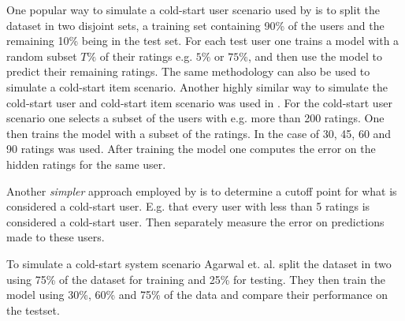 One popular way to simulate a cold-start user scenario used by \cite{Stern2009, Lam2008} is to split the dataset in two disjoint sets, a training set containing 90\% of the users and the remaining 10\% being in the test set. For each test user one trains a model with a random subset $T\%$ of their ratings e.g. $5\%$ or $75\%$, and then use the model to predict their remaining ratings. The same methodology can also be used to simulate a cold-start item scenario. Another highly similar way to simulate the cold-start user and cold-start item scenario was used in \cite{Rashid2002, Rashid2008}. For the cold-start user scenario one selects a subset of the users with e.g. more than 200 ratings. One then trains the model with a subset of the ratings. In the case of \cite{Rashid2002} 30, 45, 60 and 90 ratings was used. After training the model one computes the error on the hidden ratings for the same user.

Another \emph{simpler} approach employed by \cite{Massa2007, Jamali2009} is to determine a cutoff point for what is considered a cold-start user. E.g. that every user with less than 5 ratings is considered a cold-start user. Then separately measure the error on predictions made to these users.

To simulate a cold-start system scenario Agarwal et. al. \cite{2009} split the dataset in two using 75\% of the dataset for training and 25\% for testing. They then train the model using 30\%, 60\% and 75\% of the data and compare their performance on the testset.





